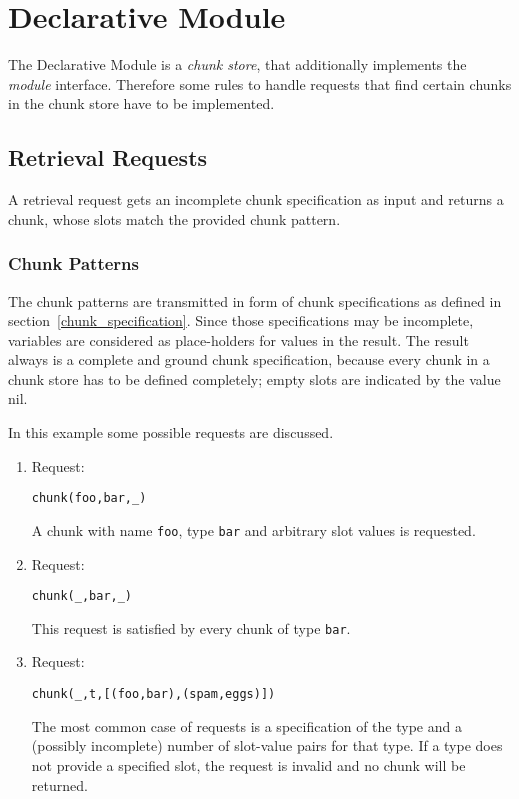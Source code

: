 \section{Declarative Module}

The Declarative Module is a \emph{chunk store}, that additionally implements the \emph{module} interface. Therefore some rules to handle requests that find certain chunks in the chunk store have to be implemented. 

\subsection{Retrieval Requests}

A retrieval request gets an incomplete chunk specification as input and returns a chunk, whose slots match the provided chunk pattern.

\subsubsection{Chunk Patterns}

The chunk patterns are transmitted in form of chunk specifications as defined in section~\ref{chunk_specification}. Since those specifications may be incomplete, variables are considered as place-holders for values in the result. The result always is a complete and ground chunk specification, because every chunk in a chunk store has to be defined completely; empty slots are indicated by the value nil.

\begin{example}
In this example some possible requests are discussed.

\begin{enumerate}
 \item Request:
\begin{lstlisting}
chunk(foo,bar,_)        
\end{lstlisting}

A chunk with name \verb|foo|, type \verb|bar| and arbitrary slot values is requested.

 \item Request:
\begin{lstlisting}
chunk(_,bar,_)        
\end{lstlisting}

This request is satisfied by every chunk of type \verb|bar|.

 \item Request:
\begin{lstlisting}
chunk(_,t,[(foo,bar),(spam,eggs)])        
\end{lstlisting}

The most common case of requests is a specification of the type and a (possibly incomplete) number of slot-value pairs for that type. If a type does not provide a specified slot, the request is invalid and no chunk will be returned.

\end{enumerate}

\end{example}

